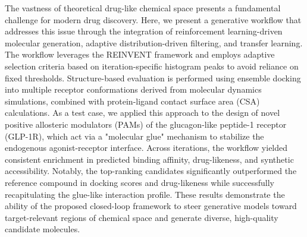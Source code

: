 The vastness of theoretical drug-like chemical space presents a fundamental challenge for modern drug discovery. Here, we present a generative workflow that addresses this issue through the integration of reinforcement learning-driven molecular generation, adaptive distribution-driven filtering, and transfer learning. The workflow leverages the REINVENT framework and employs adaptive selection criteria based on iteration-specific histogram peaks to avoid reliance on fixed thresholds. Structure-based evaluation is performed using ensemble docking into multiple receptor conformations derived from molecular dynamics simulations, combined with protein-ligand contact surface area (CSA) calculations. As a test case, we applied this approach to the design of novel positive allosteric modulators (PAMs) of the glucagon-like peptide-1 receptor (GLP-1R), which act via a "molecular glue" mechanism to stabilize the endogenous agonist-receptor interface. Across iterations, the workflow yielded consistent enrichment in predicted binding affinity, drug-likeness, and synthetic accessibility. Notably, the top-ranking candidates significantly outperformed the reference compound in docking scores and drug-likeness while successfully recapitulating the glue-like interaction profile. These results demonstrate the ability of the proposed closed-loop framework to steer generative models toward target-relevant regions of chemical space and generate diverse, high-quality candidate molecules.